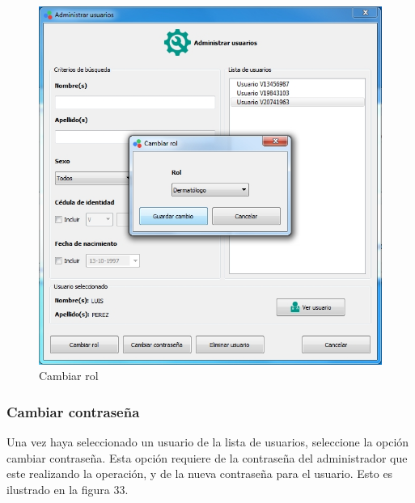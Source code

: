 \begin{figure}[H]
  \centering
  \includegraphics[width=1\linewidth]{./img/administrar-rol.jpg}
\caption{Cambiar rol}
\end{figure}
		
		\subsubsection{Cambiar contrase\~{n}a}
		
		Una vez haya seleccionado un usuario de la lista de usuarios, seleccione la opci\'{o}n cambiar contrase\~{n}a. Esta opci\'{o}n requiere de la contrase\~{n}a del administrador que este realizando la operaci\'{o}n, y de la nueva contrase\~{n}a para el usuario. Esto es ilustrado en la figura 33.
		
